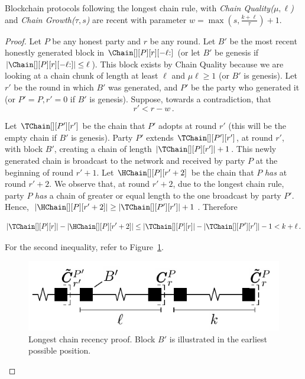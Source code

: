 \begin{lemma}\label{lem.longest-chain-recency}
  Blockchain protocols following the longest chain rule,
  with \emph{Chain Quality($\mu,\ell$)} and
  \emph{Chain Growth($\tau, s$)}
  are recent with parameter $w = \max(s, \frac{k + \ell}{\tau}) + 1$.
\end{lemma}
\begin{proof}
  Let $P$ be any honest party and $r$ be any round.
  Let $B'$ be the most recent honestly generated block
  in $\Chain[][P][r][{-\ell}{:}]$
  (or let $B'$ be genesis if $|\Chain[][P][r][{-\ell}{:}]| \leq \ell$).
  This block exists by
  Chain Quality because we are looking at a chain chunk of length at least $\ell$ and
  $\mu\ell \geq 1$ (or $B'$ is genesis).
  Let $r'$ be the round in which $B'$ was generated, and
  $P'$ be the party who generated it
  (or $P' = P, r' = 0$ if $B'$ is genesis).
  Suppose, towards a contradiction, that
  \begin{equation}
    r' < r - w\,.\label{eq:bitcoin-r-bound}
  \end{equation}

  Let $\TChain[][P'][r']$ be the chain that $P'$ adopts at
  round $r'$ (this will be the empty chain if $B'$ is genesis).
  Party $P'$ extends $\TChain[][P'][r']$, at round $r'$, with block $B'$,
  creating a chain of length $|\TChain[][P][r']| + 1$.
  This newly generated chain is broadcast to the network and
  received by party $P$ at the beginning of round $r' + 1$.
  Let $\HChain[][P][r' + 2]$ be the chain
  that $P$ \emph{has} at round $r' + 2$.
  We observe that, at round $r' + 2$, due to the
  longest chain rule, party $P$ \emph{has} a chain of greater or equal
  length to the one broadcast by party $P'$. Hence,
  $|\HChain[][P][r' + 2]| \geq |\TChain[][P'][r']| + 1$. Therefore

  \begin{equation}
    |\TChain[][P][r]| - |\HChain[][P][r' + 2]| \leq
     |\TChain[][P][r]| - |\TChain[][P'][r']| - 1 <
     k + \ell\,. \label{eq:bitcoin-contradiction}
  \end{equation}

  For the second inequality, refer to Figure~\ref{fig:longest-chain-recency-proof}.

  \begin{figure}
    \centering
    \includegraphics[width=0.5\columnwidth,keepaspectratio]{figures/longest-chain-proof.pdf}
    \caption{Longest chain recency proof. Block $B'$ is illustrated in the
             earliest possible position.
    }
   \label{fig:longest-chain-recency-proof}
  \end{figure}


\end{proof}
